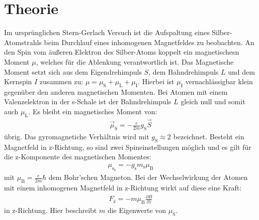 \section{Theorie}
\label{sec:Theorie}
Im ursprünglichen Stern-Gerlach Versuch ist die Aufspaltung eines Silber-Atomstrahls beim
Durchlauf eines inhomogenen Magnetfeldes zu beobachten.
An den Spin vom äußeren Elektron des Silber-Atoms koppelt ein magnetischesn
Moment $\mu$, welches für die Ablenkung verantwortlich ist.
Das Magnetische Moment setzt sich aus dem Eigendrehimpuls $S$,
dem Bahndrehimpuls $L$ und dem Kernspin $I$ zusammen zu: $\mu=\mu_\mathrm{S}+\mu_\mathrm{L}+\mu_\mathrm{I}$.
Hierbei ist $\mu_\mathrm{I}$ vernachlässigbar klein gegenüber den anderen
magnetischen Momenten.
Bei Atomen mit einem Valenzelektron in der s-Schale ist der Bahndrehimpuls
$L$ gleich null und somit auch $\mu_\mathrm{L}$.
Es bleibt ein magnetisches Moment von:
\begin{align}
  \vec{\mu}_\mathrm{S}=-\frac{e}{2m}g_\mathrm{S}\vec{S}
\end{align}
übrig. Das gyromagnetiche Verhältnis wird mit $g_\mathrm{S}\approx 2$ bezeichnet.
Besteht ein Magnetfeld in z-Richtung, so sind zwei Spineinstellungen möglich und
es gilt für die z-Komponente des magnetischen Momentes:
\begin{align}
  \mu_\mathrm{s_\mathrm{z}}=-g_\mathrm{s}m_\mathrm{s}\mu_\mathrm{B}
\end{align}
mit $\mu_\mathrm{B}=\frac{e}{2m}\hbar$ dem Bohr'schen Magneton.
Bei der Wechselwirkung der Atomen mit einem inhomogenen Magnetfeld
in z-Richtung wirkt auf diese eine Kraft:
\begin{align}
  F_\mathrm{z}=-m\mu_\mathrm{B}\frac{\partial B}{\partial z}
\end{align}
in z-Richtung. Hier beschreibt $m$ die Eigenwerte von $\mu_\mathrm{S}$.

